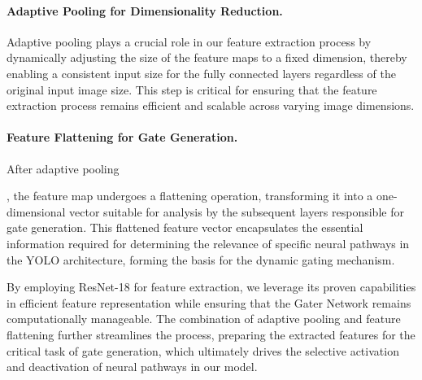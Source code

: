 
\paragraph{Adaptive Pooling for Dimensionality Reduction.} Adaptive pooling plays a crucial role in our feature extraction process by dynamically adjusting the size of the feature maps to a fixed dimension, thereby enabling a consistent input size for the fully connected layers regardless of the original input image size. This step is critical for ensuring that the feature extraction process remains efficient and scalable across varying image dimensions.


\paragraph{Feature Flattening for Gate Generation.} After adaptive pooling , the feature map undergoes a flattening operation, transforming it into a one-dimensional vector suitable for analysis by the subsequent layers responsible for gate generation. This flattened feature vector encapsulates the essential information required for determining the relevance of specific neural pathways in the YOLO architecture, forming the basis for the dynamic gating mechanism.

By employing ResNet-18 for feature extraction, we leverage its proven capabilities in efficient feature representation while ensuring that the Gater Network remains computationally manageable. The combination of adaptive pooling and feature flattening further streamlines the process, preparing the extracted features for the critical task of gate generation, which ultimately drives the selective activation and deactivation of neural pathways in our model.

